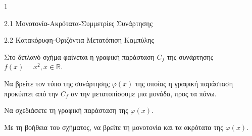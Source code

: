 \begin{ylh}{1}
\item 2.1 Μονοτονία-Ακρότατα-Συμμετρίες Συνάρτησης
\item 2.2 Κατακόρυφη-Οριζόντια Μετατόπιση Καμπύλης
\end{ylh}
\begin{center}
\end{center}
Στο διπλανό σχήμα φαίνεται η γραφική παράσταση $C_f$ της συνάρτησης $f(x) = x^2, x \in \mathbb{R}$.
\begin{alist}
\item Να βρείτε τον τύπο της συνάρτησης $\varphi(x)$ της οποίας η γραφική παράσταση προκύπτει από την $C_f$ αν την μετατοπίσουμε μια μονάδα, προς τα πάνω.
\item Να σχεδιάσετε τη γραφική παράσταση της $\varphi(x)$.
\item Με τη βοήθεια του σχήματος, να βρείτε τη μονοτονία και τα ακρότατα της $\varphi(x)$.
\end{alist}


